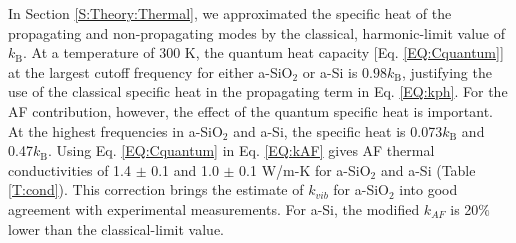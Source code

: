 \documentclass[aps,prb,onecolumn,preprint,superscriptaddress,footinbib,amsmath,amssymb,floatfix]{revtex4}
\begin{document}
In Section \ref{S:Theory:Thermal}, we approximated the specific heat 
of the propagating 
and non-propagating modes by the classical, harmonic-limit 
value of $k_{\text{B}}$. At a temperature of $300$ K, the quantum 
heat capacity [Eq. \eqref{EQ:Cquantum}] 
at the largest cutoff frequency for either a-SiO$_2$ or a-Si 
is $0.98 k_{\text{B}}$, justifying the 
use of the classical specific heat in the propagating term 
in Eq. \eqref{EQ:kph}. For the AF contribution, however, the 
effect of the quantum specific heat is important. At the highest 
frequencies in a-SiO$_2$ and a-Si, the specific heat is 
0.073$k_{\text{B}}$ and 0.47$k_{\text{B}}$. 
Using Eq. \eqref{EQ:Cquantum} 
in Eq. \eqref{EQ:kAF} gives AF thermal conductivities of 
1.4 $\pm$ 0.1 and 
1.0 $\pm$ 0.1 W/m-K for a-SiO$_2$ and a-Si (Table \ref{T:cond}). 
This correction brings the estimate of $k_{vib}$ for 
a-SiO$_2$ into good agreement with experimental measurements.
\cite{cahill_lattice_1988,lee_heat_1997,
yamane_measurement_2002,regner_broadband_2013} 
For a-Si, the modified $k_{AF}$ is 20$\%$ lower than the 
classical-limit value. 
\end{document}
